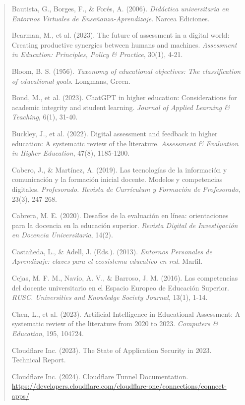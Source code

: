 \documentclass[12pt,a4paper]{report}
\begin{document}
\begin{quote}
\begin{thebibliography}{99}
Bautista, G., Borges, F., \& Forés, A. (2006). \textit{Didáctica universitaria en Entornos Virtuales de Enseñanza-Aprendizaje}. Narcea Ediciones.

Bearman, M., et al. (2023). The future of assessment in a digital world: Creating productive synergies between humans and machines. \textit{Assessment in Education: Principles, Policy \& Practice}, 30(1), 4-21.

Bloom, B. S. (1956). \textit{Taxonomy of educational objectives: The classification of educational goals}. Longmans, Green.

Bond, M., et al. (2023). ChatGPT in higher education: Considerations for academic integrity and student learning. \textit{Journal of Applied Learning \& Teaching}, 6(1), 31-40.

Buckley, J., et al. (2022). Digital assessment and feedback in higher education: A systematic review of the literature. \textit{Assessment \& Evaluation in Higher Education}, 47(8), 1185-1200.

Cabero, J., \& Martínez, A. (2019). Las tecnologías de la información y comunicación y la formación inicial docente. Modelos y competencias digitales. \textit{Profesorado. Revista de Currículum y Formación de Profesorado}, 23(3), 247-268.

Cabrera, M. E. (2020). Desafíos de la evaluación en línea: orientaciones para la docencia en la educación superior. \textit{Revista Digital de Investigación en Docencia Universitaria}, 14(2).

Castañeda, L., \& Adell, J. (Eds.). (2013). \textit{Entornos Personales de Aprendizaje: claves para el ecosistema educativo en red}. Marfil.

Cejas, M. F. M., Navío, A. V., \& Barroso, J. M. (2016). Las competencias del docente universitario en el Espacio Europeo de Educación Superior. \textit{RUSC. Universities and Knowledge Society Journal}, 13(1), 1-14.

Chen, L., et al. (2023). Artificial Intelligence in Educational Assessment: A systematic review of the literature from 2020 to 2023. \textit{Computers \& Education}, 195, 104724.

Cloudflare Inc. (2023). The State of Application Security in 2023. Technical Report.

Cloudflare Inc. (2024). Cloudflare Tunnel Documentation. \url{https://developers.cloudflare.com/cloudflare-one/connections/connect-apps/}


\end{thebibliography}
\end{quote}
\end{document}
